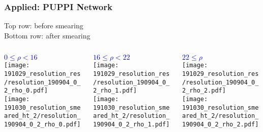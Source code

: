 \documentclass{beamer}
\begin{document}
\begin{frame}
  \frametitle{Applied: PUPPI Network}

  Top row: before smearing \\
  Bottom row: after smearing \\
  \vfill

  \begin{columns}
    \begin{column}{0.3\linewidth}
      \centering
      \textcolor{blue}{$0 \leq \rho < 16$} \\
      \texttt{[image: 191029\_resolution\_res/resolution\_190904\_0\_2\_rho\_0.pdf]} \\
      \texttt{[image: 191030\_resolution\_smeared\_ht\_2/resolution\_190904\_0\_2\_rho\_0.pdf]}
    \end{column}
    \begin{column}{0.3\linewidth}
      \centering
      \textcolor{blue}{$16 \leq \rho < 22$} \\
      \texttt{[image: 191029\_resolution\_res/resolution\_190904\_0\_2\_rho\_1.pdf]} \\
      \texttt{[image: 191030\_resolution\_smeared\_ht\_2/resolution\_190904\_0\_2\_rho\_1.pdf]}
    \end{column}
    \begin{column}{0.3\linewidth}
      \centering
      \textcolor{blue}{$22 \leq \rho$} \\
      \texttt{[image: 191029\_resolution\_res/resolution\_190904\_0\_2\_rho\_2.pdf]} \\
      \texttt{[image: 191030\_resolution\_smeared\_ht\_2/resolution\_190904\_0\_2\_rho\_2.pdf]}
    \end{column}
  \end{columns}

\end{frame}
\end{document}
